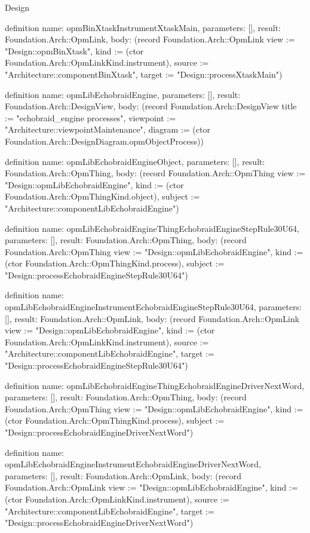\begin{lexlean}{Design}
\begin{semanticmodule}
definition{
  name: opmBinXtaskInstrumentXtaskMain,
  parameters: [],
  result: Foundation.Arch::OpmLink,
  body: (record Foundation.Arch::OpmLink {view := "Design::opmBinXtask", kind := (ctor Foundation.Arch::OpmLinkKind.instrument), source := "Architecture::componentBinXtask", target := "Design::processXtaskMain"})
}

definition{
  name: opmLibEchobraidEngine,
  parameters: [],
  result: Foundation.Arch::DesignView,
  body: (record Foundation.Arch::DesignView {title := "echobraid_engine processes", viewpoint := "Architecture::viewpointMaintenance", diagram := (ctor Foundation.Arch::DesignDiagram.opmObjectProcess)})
}

definition{
  name: opmLibEchobraidEngineObject,
  parameters: [],
  result: Foundation.Arch::OpmThing,
  body: (record Foundation.Arch::OpmThing {view := "Design::opmLibEchobraidEngine", kind := (ctor Foundation.Arch::OpmThingKind.object), subject := "Architecture::componentLibEchobraidEngine"})
}

definition{
  name: opmLibEchobraidEngineThingEchobraidEngineStepRule30U64,
  parameters: [],
  result: Foundation.Arch::OpmThing,
  body: (record Foundation.Arch::OpmThing {view := "Design::opmLibEchobraidEngine", kind := (ctor Foundation.Arch::OpmThingKind.process), subject := "Design::processEchobraidEngineStepRule30U64"})
}

definition{
  name: opmLibEchobraidEngineInstrumentEchobraidEngineStepRule30U64,
  parameters: [],
  result: Foundation.Arch::OpmLink,
  body: (record Foundation.Arch::OpmLink {view := "Design::opmLibEchobraidEngine", kind := (ctor Foundation.Arch::OpmLinkKind.instrument), source := "Architecture::componentLibEchobraidEngine", target := "Design::processEchobraidEngineStepRule30U64"})
}

definition{
  name: opmLibEchobraidEngineThingEchobraidEngineDriverNextWord,
  parameters: [],
  result: Foundation.Arch::OpmThing,
  body: (record Foundation.Arch::OpmThing {view := "Design::opmLibEchobraidEngine", kind := (ctor Foundation.Arch::OpmThingKind.process), subject := "Design::processEchobraidEngineDriverNextWord"})
}

definition{
  name: opmLibEchobraidEngineInstrumentEchobraidEngineDriverNextWord,
  parameters: [],
  result: Foundation.Arch::OpmLink,
  body: (record Foundation.Arch::OpmLink {view := "Design::opmLibEchobraidEngine", kind := (ctor Foundation.Arch::OpmLinkKind.instrument), source := "Architecture::componentLibEchobraidEngine", target := "Design::processEchobraidEngineDriverNextWord"})
}


\end{semanticmodule}
\end{lexlean}
